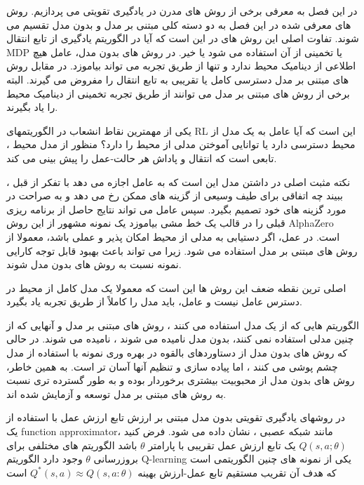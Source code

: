 
در این فصل به معرفی برخی از روش های مدرن در یادگیری تقویتی می پردازیم. روش های معرفی شده در این فصل به دو دسته کلی مبتنی بر مدل و بدون مدل تقسیم می شوند. تفاوت اصلی این روش های در این است که آیا در الگوریتم یادگیری از تابع انتقال MDP یا تخمینی از آن استفاده می شود یا خیر. در روش های بدون مدل، عامل هیچ اطلاعی از دینامیک محیط ندارد و تنها از طریق تجربه می تواند بیاموزد. در مقابل روش های مبتنی بر مدل دسترسی کامل یا تقریبی به تابع انتقال را مفروض می گیرند. البته برخی از روش های مبتنی بر مدل می توانند از طریق تجربه تخمینی از دینامیک محیط را یاد بگیرند.




یکی از مهمترین نقاط انشعاب در الگوریتم\nf های RL این است که آیا عامل به یک مدل از محیط دسترسی دارد یا  توانایی آموختن مدلی از محیط را دارد؟ منظور از مدل محیط ، تابعی است که انتقال و پاداش هر حالت-عمل را پیش بینی می کند.

نکته مثبت اصلی در داشتن مدل این است که به عامل اجازه می دهد با تفکر از قبل ، ببیند چه اتفاقی برای طیف وسیعی از گزینه های ممکن رخ می دهد و به صراحت در مورد گزینه های خود تصمیم بگیرد. سپس عامل می تواند نتایج حاصل از برنامه ریزی قبلی را در قالب یک خط مشی بیاموزد یک نمونه مشهور از این روش AlphaZero است. در عمل، اگر دستیابی به مدلی از محیط امکان پذیر و عملی باشد، معمولا از روش های مبتنی بر مدل استفاده می شود. زیرا می تواند باعث بهبود قابل توجه کارایی نمونه نسبت به روش های بدون مدل شوند.

اصلی ترین نقطه ضعف این روش ها این است که معمولا یک مدل کامل از محیط  در دسترس عامل نیست و عامل، باید مدل را کاملاً از طریق تجربه یاد بگیرد.

الگوریتم هایی که از یک مدل استفاده می کنند ، روش های مبتنی بر مدل و آنهایی که از چنین مدلی استفاده نمی کنند، بدون مدل نامیده می شوند ، نامیده می شوند. در حالی که روش های بدون مدل از دستاوردهای بالقوه در بهره وری نمونه با استفاده از مدل چشم پوشی می کنند ، اما پیاده سازی و تنظیم آنها آسان تر است. به همین خاطر، روش های بدون مدل از محبوبیت بیشتری برخوردار بوده و به طور گسترده تری نسبت به روش های مبتنی بر مدل توسعه و آزمایش شده اند.




در روشهای یادگیری تقویتی بدون مدل مبتنی بر ارزش
تابع ارزش عمل با استفاده از  یک function approximator، مانند شبکه عصبی ، نشان داده می شود. فرض کنید
$Q(s,a;\theta)$
یک تابع ارزش عمل تقریبی با پارامتر 
$\theta$
باشد
الگوریتم های مختلفی برای بروزرسانی $\theta$ وجود دارد
الگوریتم Q-learning یکی از نمونه های چنین الگوریتمی است
که هدف آن تقریب مستقیم تابع عمل-ارزش بهینه 
$Q^*(s,a) \approx Q(s,a: \theta)$
 است

